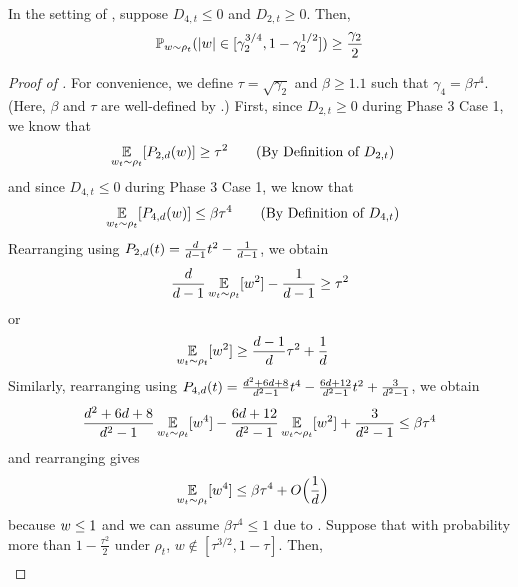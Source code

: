 \begin{lemma} \label{lemma:case_1_mass_in_middle}
In the setting of , suppose $D_{4, t} \leq 0$ and $D_{2, t} \geq 0$. Then,
\begin{align}
\mathbb{P}_{w \sim \rho_t} (|w| \in [\gamma_2^{3/4}, 1 - \gamma_2^{1/2}]) \geq \frac{\gamma_2}{2}
\end{align}
\end{lemma}
\begin{proof}[Proof of ]
For convenience, we define $\tau = \sqrt{\gamma_2}$ and $\beta \geq 1.1$ such that $\gamma_4 = \beta \tau^4$. (Here, $\beta$ and $\tau$ are well-defined by .) First, since $D_{2, t} \geq 0$ during Phase 3 Case 1, we know that
\begin{align}
\E_{w_t \sim \rho_t} [\PtwoD(\w)]
& \geq \tau^2
\tag{By Definition of $D_{2, t}$}
\end{align}
and since $D_{4, t} \leq 0$ during Phase 3 Case 1, we know that
\begin{align}
\E_{\w_t \sim \rho_t} [\PfourD(\w)]
& \leq \beta \tau^4
\tag{By Definition of $D_{4, t}$}
\end{align}
Rearranging using ${P_{2, d}}(t) = \frac{d}{d - 1} t^2 - \frac{1}{d - 1}$, we obtain
\begin{align}
\frac{d}{d - 1} \operatorname*{\mathbb{E}}_{w_t \sim \rho_t} [w^2] - \frac{1}{d - 1} \geq \tau^2
\end{align}
or
\begin{align} \label{eq:second_moment_lower}
\operatorname*{\mathbb{E}}_{w_t \sim \rho_t} [w^2]
& \geq \frac{d - 1}{d} \tau^2 + \frac{1}{d}
\end{align}
Similarly, rearranging using ${P_{4, d}}(t) = \frac{d^2 + 6d + 8}{d^2 - 1} t^4 - \frac{6d + 12}{d^2 - 1} t^2 + \frac{3}{d^2 - 1}$, we obtain
\begin{align}
\frac{d^2 + 6d + 8}{d^2 - 1} \operatorname*{\mathbb{E}}_{w_t \sim \rho_t}[w^4] - \frac{6d + 12}{d^2 - 1} \operatorname*{\mathbb{E}}_{w_t \sim \rho_t} [w^2] + \frac{3}{d^2 - 1} \leq \beta \tau^4
\end{align}
and rearranging gives
\begin{align} \label{eq:fourth_moment_upper}
\operatorname*{\mathbb{E}}_{w_t \sim \rho_t}[w^4]
& \leq \beta \tau^4 + O\Big(\frac{1}{d}\Big)
\end{align}
because $w \leq 1$ and we can assume $\beta \tau^4 \leq 1$ due to . Suppose that with probability more than $1 - \frac{\tau^2}{2}$ under $\rho_t$, $w \not\in [\tau^{3/2}, 1 - \tau]$. Then,
\begin{align}

\end{align}
\end{proof}
